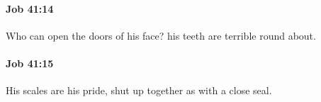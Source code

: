 		\paragraph{Job 41:14} %
			\label{JOB-41-14}

			Who can open the doors of his face? his teeth are terrible round about.


		\paragraph{Job 41:15} %
			\label{JOB-41-15}

			His scales are his pride, shut up together as with a close seal.


